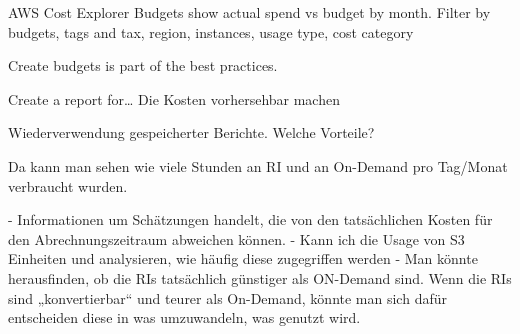

AWS Cost Explorer Budgets show actual spend vs budget by month.
Filter by budgets, tags and tax,
region, instances, usage type, cost category 

Create budgets is part of the best practices.

Create a report for…
Die Kosten vorhersehbar machen

Wiederverwendung gespeicherter Berichte. Welche Vorteile?

 
Da kann man sehen wie viele Stunden an RI und an On-Demand pro Tag/Monat verbraucht wurden.

-	Informationen um Schätzungen handelt, die von den tatsächlichen Kosten für den Abrechnungszeitraum abweichen können. %
-	Kann ich die Usage von S3 Einheiten und analysieren, wie häufig diese zugegriffen werden %
-	Man könnte herausfinden, ob die RIs tatsächlich günstiger als ON-Demand sind. Wenn die RIs sind „konvertierbar“ und teurer als On-Demand, könnte man sich dafür entscheiden diese in was umzuwandeln, was genutzt wird. %




